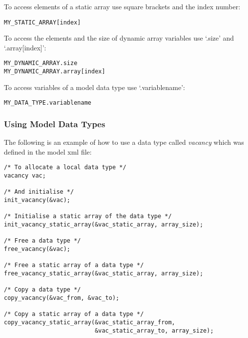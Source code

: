 To access elements of a static array use square brackets and the index number:

\begin{mylisting}
\begin{verbatim}
MY_STATIC_ARRAY[index]
\end{verbatim}
\end{mylisting}

To access the elements and the size of dynamic array variables use
`.size' and `.array[index]':

\begin{mylisting}
\begin{verbatim}
MY_DYNAMIC_ARRAY.size
MY_DYNAMIC_ARRAY.array[index]
\end{verbatim}
\end{mylisting}

To access variables of a model data type use `.variablename':

\begin{mylisting}
\begin{verbatim}
MY_DATA_TYPE.variablename
\end{verbatim}
\end{mylisting}

\subsubsection{Using Model Data Types}

The following is an example of how to use a data type called
\emph{vacancy} which was defined in the model xml file:

\begin{mylisting}
\begin{verbatim}
/* To allocate a local data type */
vacancy vac;

/* And initialise */
init_vacancy(&vac);

/* Initialise a static array of the data type */
init_vacancy_static_array(&vac_static_array, array_size);

/* Free a data type */
free_vacancy(&vac);

/* Free a static array of a data type */
free_vacancy_static_array(&vac_static_array, array_size);

/* Copy a data type */
copy_vacancy(&vac_from, &vac_to);

/* Copy a static array of a data type */
copy_vacancy_static_array(&vac_static_array_from,
                          &vac_static_array_to, array_size);
\end{verbatim}
\end{mylisting}

